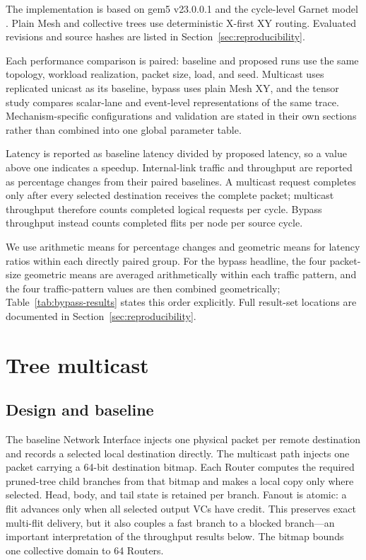 \documentclass[10pt]{article}
\begin{document}
The implementation is based on gem5 v23.0.0.1 \cite{gem5-simulator} and the
cycle-level Garnet model \cite{garnet}.  Plain Mesh and collective trees use
deterministic X-first XY routing.  Evaluated revisions and source hashes are
listed in Section~\ref{sec:reproducibility}.

Each performance comparison is paired: baseline and proposed runs use the
same topology, workload realization, packet size, load, and seed.  Multicast
uses replicated unicast as its baseline, bypass uses plain Mesh XY, and the
tensor study compares scalar-lane and event-level representations of the same
trace.  Mechanism-specific configurations and validation are stated in their
own sections rather than combined into one global parameter table.

Latency is reported as baseline latency divided by proposed latency, so a
value above one indicates a speedup.  Internal-link traffic and throughput are
reported as percentage changes from their paired baselines.  A multicast
request completes only after every selected destination receives the complete
packet; multicast throughput therefore counts completed logical requests per
cycle.  Bypass throughput instead counts completed flits per node per source
cycle.

We use arithmetic means for percentage changes and geometric means for
latency ratios within each directly paired group.  For the bypass headline,
the four packet-size geometric means are averaged arithmetically within each
traffic pattern, and the four traffic-pattern values are then combined
geometrically; Table~\ref{tab:bypass-results} states this order explicitly.
Full result-set locations are documented in
Section~\ref{sec:reproducibility}.

\section{Tree multicast}

\subsection{Design and baseline}

The baseline Network Interface injects one physical packet per remote
destination and records a selected local destination directly.
The multicast path injects one packet carrying a 64-bit destination bitmap.
Each Router computes the required pruned-tree child branches from that bitmap
and makes a local copy only where selected.  Head, body, and tail
state is retained per branch.  Fanout is atomic: a flit advances only when all
selected output VCs have credit.  This preserves exact multi-flit delivery,
but it also couples a fast branch to a blocked branch---an important
interpretation of the throughput results below.  The bitmap bounds one
collective domain to 64 Routers.
\end{document}
